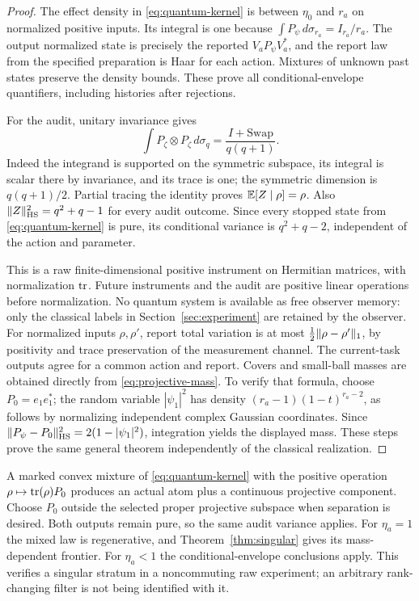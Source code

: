 \begin{proof}
The effect density in \eqref{eq:quantum-kernel} is between $\eta_0$ and $r_a$ on normalized positive inputs. Its integral is one because $\int P_\psi\,d\sigma_{r_a}=I_{r_a}/r_a$. The output normalized state is precisely the reported $V_aP_\psi V_a^*$, and the report law from the specified preparation is Haar for each action. Mixtures of unknown past states preserve the density bounds. These prove all conditional-envelope quantifiers, including histories after rejections.

For the audit, unitary invariance gives
\[
 \int P_\zeta\otimes P_\zeta\,d\sigma_q
       =\frac{I+\mathrm{Swap}}{q(q+1)}.
\]
Indeed the integrand is supported on the symmetric subspace, its integral is scalar there by invariance, and its trace is one; the symmetric dimension is $q(q+1)/2$. Partial tracing the identity proves $\mathbb E[Z\mid\rho]=\rho$. Also $\lVert Z\rVert_{\mathrm{HS}}^2=q^2+q-1$ for every audit outcome. Since every stopped state from \eqref{eq:quantum-kernel} is pure, its conditional variance is $q^2+q-2$, independent of the action and parameter.

This is a raw finite-dimensional positive instrument on Hermitian matrices, with normalization $\operatorname{tr}$. Future instruments and the audit are positive linear operations before normalization. No quantum system is available as free observer memory: only the classical labels in Section~\ref{sec:experiment} are retained by the observer. For normalized inputs $\rho,\rho'$, report total variation is at most $\frac12\lVert\rho-\rho'\rVert_1$, by positivity and trace preservation of the measurement channel. The current-task outputs agree for a common action and report. Covers and small-ball masses are obtained directly from \eqref{eq:projective-mass}. To verify that formula, choose $P_0=e_1e_1^*$; the random variable $|\psi_1|^2$ has density $(r_a-1)(1-t)^{r_a-2}$, as follows by normalizing independent complex Gaussian coordinates. Since $\lVert P_\psi-P_0\rVert_{\mathrm{HS}}^2=2(1-|\psi_1|^2)$, integration yields the displayed mass. These steps prove the same general theorem independently of the classical realization.
\end{proof}

A marked convex mixture of \eqref{eq:quantum-kernel} with the positive operation $\rho\mapsto\operatorname{tr}(\rho)P_0$ produces an actual atom plus a continuous projective component. Choose $P_0$ outside the selected proper projective subspace when separation is desired. Both outputs remain pure, so the same audit variance applies. For $\eta_a=1$ the mixed law is regenerative, and Theorem~\ref{thm:singular} gives its mass-dependent frontier. For $\eta_a<1$ the conditional-envelope conclusions apply. This verifies a singular stratum in a noncommuting raw experiment; an arbitrary rank-changing filter is not being identified with it.
